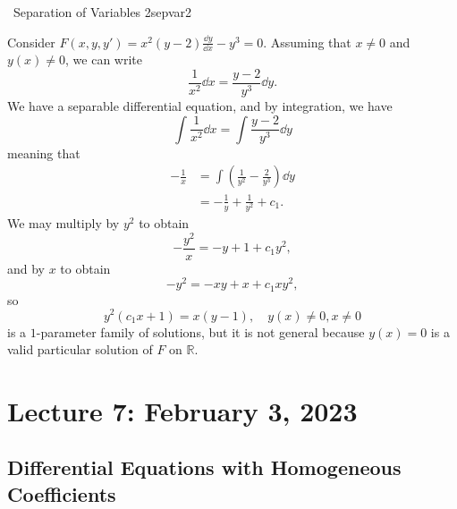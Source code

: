     \pagebreak
    \begin{example}{\Difficulty\,\Difficulty\,\,Separation of Variables 2}{sepvar2}

        Consider \(F(x,y,y')=x^2(y-2)\frac{\dd y}{\dd x}-y^3=0\). Assuming that \(x\neq0\) and \(y(x)\neq0\), we can write
        \begin{equation*}
            \frac{1}{x^2}\dd x=\frac{y-2}{y^3}\dd y.
        \end{equation*}
        We have a separable differential equation, and by integration, we have
        \begin{equation*}
            \int \frac{1}{x^2}\dd x=\int \frac{y-2}{y^3}\dd y
        \end{equation*}
        meaning that
        \begin{align*}
            -\frac{1}{x}&=\int \left(\frac{1}{y^2}-\frac{2}{y^3} \right)\dd y \\
            &=-\frac{1}{y}+\frac{1}{y^2}+c_1.
        \end{align*}
        We may multiply by \(y^2\) to obtain
        \begin{equation*}
            -\frac{y^2}{x}=-y+1+c_1y^2,
        \end{equation*}
        and by \(x\) to obtain
        \begin{equation*}
            -y^2=-xy+x+c_1xy^2,
        \end{equation*}
        so
        \begin{equation*}
            y^2(c_1x+1)=x(y-1),\quad y(x)\neq 0,x\neq 0
        \end{equation*}
        is a \(1\)-parameter family of solutions, but it is not general because \(y(x)=0\) is a valid particular solution of \(F\) on \(\mathbb{R}\).
    \end{example}

    \pagebreak

\section{Lecture 7: February 3, 2023}

\subsection{Differential Equations with Homogeneous Coefficients}

